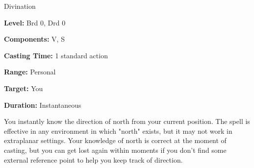 
Divination

\textbf{Level:} Brd 0, Drd 0

\textbf{Components:} V, S

\textbf{Casting Time:} 1 standard action

\textbf{Range:} Personal

\textbf{Target:} You

\textbf{Duration:} Instantaneous

You instantly know the direction of north from your current position. The spell 
is effective in any environment in which "north" exists, but it may not work 
in extraplanar settings. Your knowledge of north is correct at the moment of casting, 
but you can get lost again within moments if you don't find some external reference 
point to help you keep track of direction.

